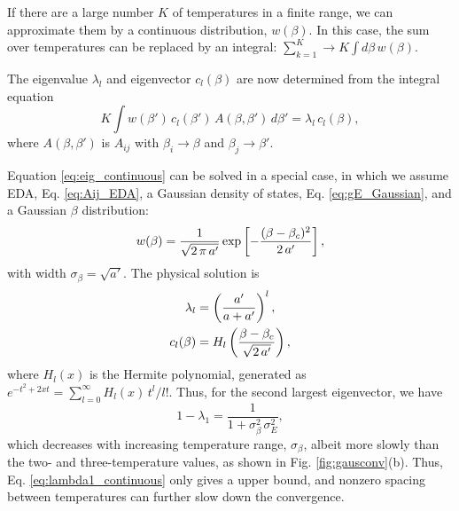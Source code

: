 \documentclass[reprint,aip,jcp,superscriptaddress]{revtex4-1}
\begin{document}
If there are a large number $K$ of temperatures
in a finite range,
{we can approximate them}
by a continuous distribution, $w(\beta)$.
%
In this case,
the sum over temperatures can be
replaced by an integral:
%
$
\sum_{k = 1}^K
\rightarrow
K \int d\beta \, w(\beta).
$

The eigenvalue $\lambda_l$
and eigenvector $c_l(\beta)$
are now determined from the integral equation
%
\begin{equation}
K \int w(\beta') \, c_l(\beta') \, A(\beta, \beta') \, d\beta'
= \lambda_l \, c_l(\beta),
\label{eq:eig_continuous}
\end{equation}
%
where
$A(\beta, \beta')$
is $A_{ij}$
with 
{$\beta_i \rightarrow \beta$ and $\beta_j \rightarrow \beta'$.}



Equation \eqref{eq:eig_continuous}
can be solved in a special case, in which
we assume EDA, Eq. \eqref{eq:Aij_EDA},
a Gaussian density of states,
Eq. \eqref{eq:gE_Gaussian},
and
a Gaussian $\beta$ distribution:
%
\begin{align}
w(\beta)
=
\frac{1}{\sqrt{2 \, \pi \, a'}}
\exp\left[
  -\frac{ (\beta - \beta_c)^2 }{ 2 \, a' }
\right],
\notag
\end{align}
%
with width $\sigma_\beta = \sqrt{a'}$.
%
%
%
The physical solution is
%
\begin{align}
\lambda_l
&=
\left(
  \frac { a' } { a + a' }
\right)^l,
\notag
\\
c_l(\beta)
&=
H_l\left(
  \frac{ \beta - \beta_c }
  { \sqrt{ 2 \, a' } }
\right),
\notag
\end{align}
%
where
$H_l(x)$
is the Hermite polynomial\cite{
arfken, *abramowitz, *wang_specfunc},
generated as
$e^{-t^2 + 2x t} = \sum_{l = 0}^\infty H_l(x) \, t^l/l!$.
%
Thus, for the second largest eigenvector,
we have
%
\begin{equation}
1 - \lambda_1
=
\frac{1}
{ 1 + \sigma_\beta^2 \, \sigma_E^2},
\label{eq:lambda1_continuous}
\end{equation}
%
which decreases
with increasing temperature range,
$\sigma_\beta$,
albeit more slowly than
the two- and three-temperature values,
as shown in Fig. \ref{fig:gausconv}(b).
%
Thus,
Eq. \eqref{eq:lambda1_continuous}
only gives a upper bound,
and nonzero spacing between temperatures
can further slow down the convergence.




\end{document}
